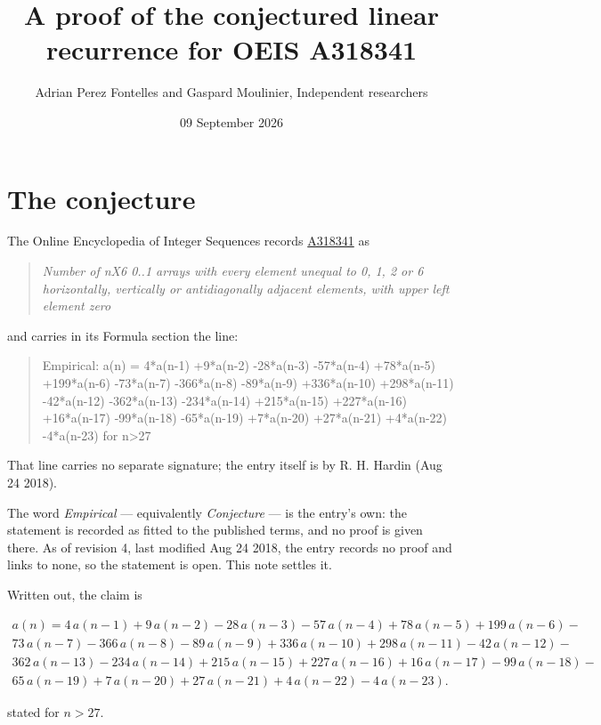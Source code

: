 \documentclass[11pt]{article}
\title{A proof of the conjectured linear recurrence for OEIS A318341}
\author{Adrian Perez Fontelles and Gaspard Moulinier, Independent researchers}
\date{09 September 2026}
\theoremstyle{definition}
\begin{document}
\maketitle
\section{The conjecture}

The Online Encyclopedia of Integer Sequences records \href{https://oeis.org/A318341}{A318341} as

\begin{quote}\itshape Number of nX6 0..1 arrays with every element unequal to 0, 1, 2 or 6 horizontally, vertically or antidiagonally adjacent elements, with upper left element zero\end{quote}

and carries in its Formula section the line:

\begin{quote}\ttfamily Empirical: a(n) = 4*a(n-1) +9*a(n-2) -28*a(n-3) -57*a(n-4) +78*a(n-5) +199*a(n-6) -73*a(n-7) -366*a(n-8) -89*a(n-9) +336*a(n-10) +298*a(n-11) -42*a(n-12) -362*a(n-13) -234*a(n-14) +215*a(n-15) +227*a(n-16) +16*a(n-17) -99*a(n-18) -65*a(n-19) +7*a(n-20) +27*a(n-21) +4*a(n-22) -4*a(n-23) for n>27\end{quote}

That line carries no separate signature; the entry itself is by R. H. Hardin (Aug 24 2018).

The word {\itshape Empirical} --- equivalently {\itshape Conjecture} --- is the entry's own: the statement is recorded as fitted to the published terms, and no proof is given there. As of revision 4, last modified Aug 24 2018, the entry records no proof and links to none, so the statement is open. This note settles it.

Written out, the claim is

\begin{multline*} a(n) = 4\,a(n-1) + 9\,a(n-2) - 28\,a(n-3) - 57\,a(n-4) + 78\,a(n-5) + 199\,a(n-6) - \\ 73\,a(n-7) - 366\,a(n-8) - 89\,a(n-9) + 336\,a(n-10) + 298\,a(n-11) - 42\,a(n-12) - \\ 362\,a(n-13) - 234\,a(n-14) + 215\,a(n-15) + 227\,a(n-16) + 16\,a(n-17) - 99\,a(n-18) - \\ 65\,a(n-19) + 7\,a(n-20) + 27\,a(n-21) + 4\,a(n-22) - 4\,a(n-23). \end{multline*}

stated for $n > 27$.
\end{document}

